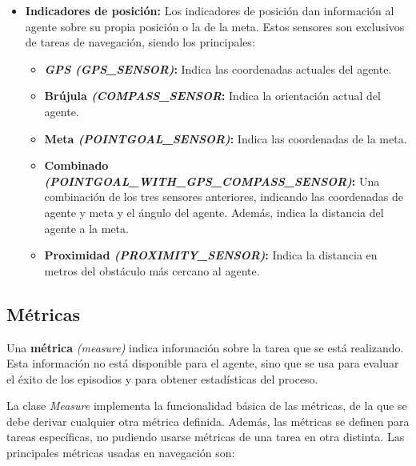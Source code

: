 \begin{itemize}
	\item \textbf{Indicadores de posición:} Los indicadores de posición dan información al agente sobre su propia posición o la de la meta. Estos sensores son exclusivos de tareas de navegación, siendo los principales:
	\begin{itemize}
	\item \textbf{\textit{GPS (GPS{\_}SENSOR)}:} Indica las coordenadas actuales del agente.
	\item \textbf{Brújula \textit{(COMPASS{\_}SENSOR}:} Indica la orientación actual del agente.
	\item \textbf{Meta \textit{(POINTGOAL{\_}SENSOR)}:} Indica las coordenadas de la meta.
	\item \textbf{Combinado \textit{(POINTGOAL{\_}WITH{\_}GPS{\_}COMPASS{\_}SENSOR)}:} Una combinación de los tres sensores anteriores, indicando las coordenadas de agente y meta y el ángulo del agente. Además, indica la distancia del agente a la meta.
	\item \textbf{Proximidad \textit{(PROXIMITY{\_}SENSOR)}:} Indica la distancia en metros del obstáculo más cercano al agente.
	\end{itemize}
\end{itemize}

\subsection{Métricas}

Una \textbf{métrica} \textit{(measure)} indica información sobre la tarea que se está realizando. Esta información no está disponible para el agente, sino que se usa para evaluar el éxito de los episodios y para obtener estadísticas del proceso.

La clase \textit{Measure} implementa la funcionalidad básica de las métricas, de la que se debe derivar cualquier otra métrica definida. Además, las métricas se definen para tareas específicas, no pudiendo usarse métricas de una tarea en otra distinta. Las principales métricas usadas en navegación son:

